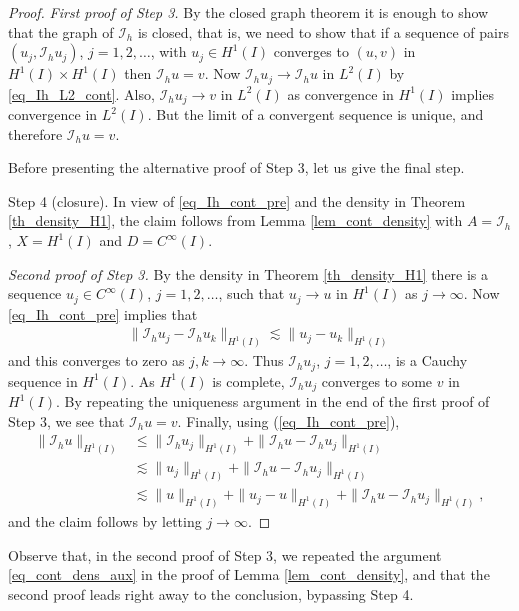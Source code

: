 \documentclass[12pt,oneside,final]{amsart}
\def\I{\mathcal I}
\begin{document}
\begin{proof}
{\em First proof of Step 3.}
By the closed graph theorem it is enough to show that the graph of $\I_h$ is closed, that is, we need to show that if a sequence of pairs $(u_j, \I_h u_j)$, $j=1,2,\dots$,
with $u_j \in H^1(I)$ converges to $(u, v)$ in $H^1(I) \times H^1(I)$ then $\I_h u = v$.
Now $\I_h u_j \to \I_h u$ in $L^2(I)$ by \eqref{eq_Ih_L2_cont}.
Also, $\I_h u_j \to v$ in $L^2(I)$ as convergence in $H^1(I)$ implies convergence in $L^2(I)$. But the limit of a convergent sequence is unique, and therefore $\I_h u = v$.

Before presenting the alternative proof of Step 3, let us give the final step.

Step 4 (closure).
In view of \eqref{eq_Ih_cont_pre} and the density in Theorem \ref{th_density_H1}, the claim follows from Lemma \ref{lem_cont_density}
with $A=\I_h$, $X = H^1(I)$ and $D = C^\infty(I)$.

{\em Second proof of Step 3.}
By the density in Theorem \ref{th_density_H1}
there is a sequence $u_j \in C^\infty(I)$, $j=1,2,\dots$,
such that $u_j \to u$ in $H^1(I)$ as $j \to \infty$.
Now \eqref{eq_Ih_cont_pre} implies that 
    \begin{align*}
\|\I_h u_j - \I_h u_k \|_{H^1(I)} \lesssim \|u_j - u_k\|_{H^1(I)}
    \end{align*}
and this converges to zero as $j,k \to \infty$. 
Thus $\I_h u_j$, $j=1,2,\dots$, is a Cauchy sequence in $H^1(I)$.
As $H^1(I)$ is complete, $\I_h u_j$ converges to some $v$ in $H^1(I)$.
By repeating the uniqueness argument in the end of the first proof of Step 3, we see that $\I_h u = v$.
Finally, using (\ref{eq_Ih_cont_pre}), 
    \begin{align*}
\|\I_h u\|_{H^1(I)} 
&\le 
\|\I_h u_j\|_{H^1(I)} + \|\I_h u - \I_h u_j\|_{H^1(I)} 
\\&\lesssim 
\|u_j\|_{H^1(I)} + \|\I_h u - \I_h u_j\|_{H^1(I)}
\\&\lesssim 
\|u\|_{H^1(I)} + \|u_j - u\|_{H^1(I)} + \|\I_h u - \I_h u_j\|_{H^1(I)},
    \end{align*}
and the claim follows by letting $j \to \infty$.
\end{proof}

Observe that, in the second proof of Step 3, we repeated the argument \eqref{eq_cont_dens_aux} in the proof of Lemma \ref{lem_cont_density}, and that the second proof leads right away to the conclusion, bypassing Step 4.
\end{document}
